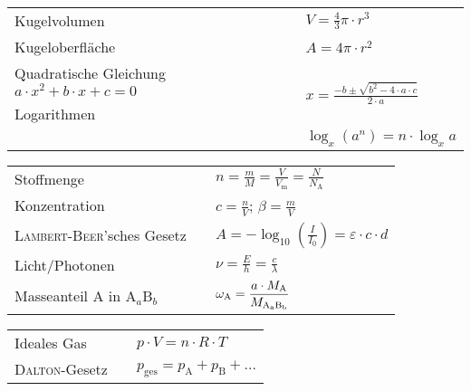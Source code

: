 \documentclass[./main.tex]{subfiles}
\begin{document}
\begin{formulabox}[Mathematik]
  \begin{center}
  \renewcommand{\arraystretch}{1.4}
    \begin{tabular}{>{\raggedleft\arraybackslash}p{} p{}p{}}
       Kugelvolumen & & $V=\frac{4}{3}\pi\cdot r^3$ \\
       Kugeloberfl\"ache & & $A=4\pi\cdot r^2$ \\
       Quadratische Gleichung $a\cdot x^2 + b\cdot x + c = 0$ & & \multirow{2}{*}{$\displaystyle x = \frac{-b\pm\sqrt{b^2-4\cdot a\cdot c}}{2\cdot a}$}\\
       Logarithmen & & $\log_x(a\cdot b) = \log_x a + \log_x b$\\
       & & $\log_x(a^n) = n\cdot \log_x a$
    \end{tabular}
  \end{center}
\end{formulabox}

\begin{formulabox}
  \begin{center}
  \renewcommand{\arraystretch}{1.8}
    \begin{tabular}{>{\raggedleft\arraybackslash}p{} p{}p{}}
        Stoffmenge & & $\displaystyle n = \frac{m}{M} = \frac{V}{V_\mathrm{m}} = \frac{N}{N_\mathrm{A}}$\\
        Konzentration & & $\displaystyle c = \frac{n}{V}$; $\displaystyle \beta = \frac{m}{V}$\\
        \textsc{Lambert}-\textsc{Beer}'sches Gesetz & & $\displaystyle A = -\log_{10}{\left(\frac{I}{I_0}\right)} = \varepsilon \cdot c \cdot d$ \\
        Licht/Photonen & & $\displaystyle \nu = \frac{E}{h} = \frac{c}{\lambda}$ \\
        Masseanteil A in A$_a$B$_b$ & & $\displaystyle \omega_\mathrm{A} = \frac{a \cdot M_\mathrm{A}}{M_{\text{A\textsubscript{a}B\textsubscript{b}}}}$
    \end{tabular}
  \end{center}
\end{formulabox}

\begin{formulabox}[Gase]
  \begin{center}
  \renewcommand{\arraystretch}{1.4}
    \begin{tabular}{>{\raggedleft\arraybackslash}p{} p{}p{}}
        Ideales Gas & & $p \cdot V = n \cdot R \cdot T$\\
        \textsc{Dalton}-Gesetz & & $p_{\mathrm{ges}} = p_\text{A} + p_\text{B} + ... $\\
    \end{tabular}
  \end{center}
\end{formulabox}
\end{document}
